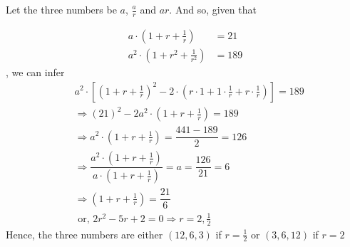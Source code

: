 \begin{solution}[\fullpage]
	Let the three numbers be $a$, $\frac{a}{r}$ and $ar$. And so, given that
	
	\begin{align}
		a\cdot\left( 1 + r + \frac{1}{r} \right) &= 21 \\
		a^2\cdot\left( 1 + r^2 + \frac{1}{r^2} \right) &= 189
	\end{align}
	, we can infer 
	\begin{align}
		&a^2\cdot\left[ \left( 1 + r + \frac{1}{r} \right)^2 - 
		2\cdot\left( r\cdot1 + 1\cdot\frac{1}{r} + r\cdot\frac{1}{r} \right)\right] = 189 \\
		&\Rightarrow (21)^2 - 2a^2\cdot\left( 1 + r + \frac{1}{r} \right) = 189 \\
		&\Rightarrow a^2\cdot\left( 1 + r + \frac{1}{r} \right) = \dfrac{441-189}{2} = 126 \\
		&\Rightarrow \dfrac{a^2\cdot\left( 1 + r + \frac{1}{r} \right)}
		{a\cdot\left( 1 + r + \frac{1}{r} \right)} = a = \dfrac{126}{21} = 6 \\
		&\Rightarrow \left( 1 + r + \frac{1}{r} \right) = \dfrac{21}{6} \\
		&\text{ or, } 2r^2 - 5r + 2 = 0 \Rightarrow r = 2, \frac{1}{2}
	\end{align}
	Hence, the three numbers are either $(12,6,3)$ if $r=\frac{1}{2}$ or $(3,6,12)$ if $r=2$
\end{solution}
